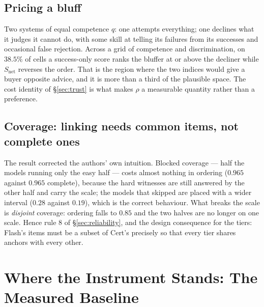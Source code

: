 \subsection{Pricing a bluff}\label{sec:bluff}

Two systems of equal competence $q$: one attempts everything; one declines what it judges it cannot do, with some skill at telling its failures from its successes and occasional false rejection. Across a grid of competence and discrimination, on $38.5\%$ of cells a success-only score ranks the bluffer at or above the decliner while $S_{\mathrm{net}}$ reverses the order. That is the region where the two indices would give a buyer opposite advice, and it is more than a third of the plausible space. The cost identity of \S\ref{sec:trust} is what makes $\rho$ a measurable quantity rather than a preference.

\subsection{Coverage: linking needs common items, not complete ones}\label{sec:coverage}

\begin{table}[!htbp]\centering\small

\caption{Ordering recovery and interval width under four coverage regimes, twelve models and 160 witnesses. ``SE, partial models'' is the interval on the models that skipped part of the suite.}
\label{tab:coverage}
\end{table}

The result corrected the authors' own intuition. Blocked coverage --- half the models running only the easy half --- costs almost nothing in ordering ($0.965$ against $0.965$ complete), because the hard witnesses are still answered by the other half and carry the scale; the models that skipped are placed with a wider interval ($0.28$ against $0.19$), which is the correct behaviour. What breaks the scale is \emph{disjoint} coverage: ordering falls to $0.85$ and the two halves are no longer on one scale. Hence rule 8 of \S\ref{sec:reliability}, and the design consequence for the tiers: Flash's items must be a subset of Cert's precisely so that every tier shares anchors with every other.

\section{Where the Instrument Stands: The Measured Baseline}\label{sec:baseline}


